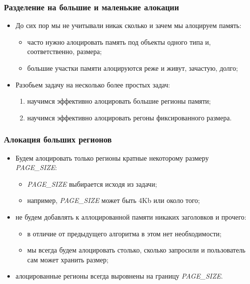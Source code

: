\begin{frame}
\frametitle{Разделение на большие и маленькие алокации}
\begin{itemize}
  \item До сих пор мы не учитывали никак сколько и зачем мы алоцируем память:
  \begin{itemize}
    \item часто нужно алоцировать память под объекты одного типа и,
    соответственно, размера;
    \item большие участки памяти алоцируются реже и живут, зачастую, долго;
  \end{itemize}
  \item Разобьем задачу на несколько более простых задач:
  \begin{enumerate}
    \item научимся эффективно алоцировать большие регионы памяти;
    \item научимся эффективно алоцировать регоны фиксированного размера.
  \end{enumerate} 
\end{itemize}
\end{frame}

\begin{frame}
\frametitle{Алокация больших регионов}
\begin{itemize}
  \item Будем алоцировать только регионы кратные некоторому размеру
  \emph{PAGE\_SIZE}:
  \begin{itemize}
    \item \emph{PAGE\_SIZE} выбирается исходя из задачи;
    \item например, \emph{PAGE\_SIZE} может быть 4Kb или около того;
  \end{itemize}
  \item не будем добавлять к аллоцированной памяти никаких заголовков и прочего:
  \begin{itemize}
    \item в отличие от предыдущего алгоритма в этом нет необходимости;
    \item мы всегда будем алоцировать столько, сколько запросили и пользователь
    сам может хранить размер;
  \end{itemize}
  \item алоцированные регионы всегда выровнены на границу \emph{PAGE\_SIZE}.
\end{itemize}
\end{frame}

